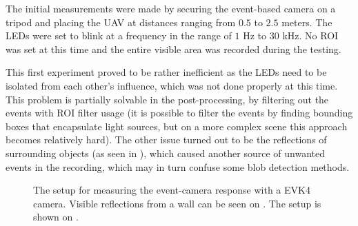The initial measurements were made by securing the event-based camera on a tripod and placing the \ac{UAV} at distances ranging from
$0.5$ to $2.5$ meters. The \ac{LED}s were set to blink at a frequency in the range of $1$ Hz to $30$ kHz. No \ac{ROI} was set at this time
and the entire visible area was recorded during the testing.

This first experiment proved to be rather inefficient as the \ac{LED}s need to be isolated from each other's influence, which
was not done properly at this time. This problem is partially solvable in the post-processing, by filtering out the events
with \ac{ROI} filter usage (it is possible to filter the events by finding bounding boxes
that encapsulate light sources, but on a more complex scene this approach becomes relatively hard).
The other issue turned out to be the reflections of surrounding objects (as seen in ), which caused
another source of unwanted events in the recording, which may in turn confuse some blob detection methods.

\begin{figure}[H]
	\centering
	\caption{
  The setup for measuring the event-camera response with a EVK4 camera. Visible reflections from a wall can be seen on . The setup is shown on .
  }
	\label{fig:meas1}
\end{figure}


